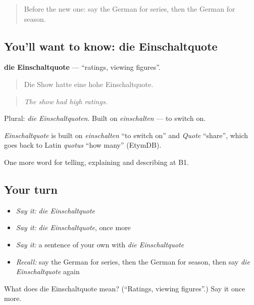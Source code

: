 \begin{quote}
Before the new one: say the German for series, then the German for season.
\end{quote}

\subsection*{You'll want to know: die Einschaltquote}
\textbf{die Einschaltquote} — \textquotedblleft{}ratings, viewing figures\textquotedblright{}.

\begin{quote}
Die Show hatte eine hohe Einschaltquote.
\end{quote}

\begin{quote}
\emph{The show had high ratings.}
\end{quote}

Plural: \emph{die Einschaltquoten}. Built on \emph{einschalten} — to switch on.

\begin{cousinweb}
\emph{Einschaltquote} is built on \emph{einschalten} \textquotedblleft{}to switch on\textquotedblright{} and \emph{Quote} \textquotedblleft{}share\textquotedblright{}, which goes back to Latin \emph{quotus} \textquotedblleft{}how many\textquotedblright{} (EtymDB).
\end{cousinweb}

\begin{grammarlens}[title={What you've built}]
One more word for telling, explaining and describing at B1.
\end{grammarlens}

\subsection*{Your turn}
\begin{itemize}
\raggedright
  \item \emph{Say it:} \emph{die Einschaltquote}
  \item \emph{Say it:} \emph{die Einschaltquote}, once more
  \item \emph{Say it:} a sentence of your own with \emph{die Einschaltquote}
  \item \emph{Recall:} say the German for series, then the German for season, then say \emph{die Einschaltquote} again
\end{itemize}

\begin{tcolorbox}[breakable,colback=teal!4,colframe=teal!35!black,title={Before you move on}]
What does die Einschaltquote mean? (\textquotedblleft{}Ratings, viewing figures\textquotedblright{}.) Say it once more.
\end{tcolorbox}
